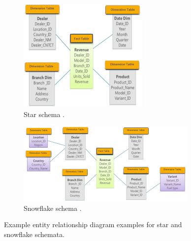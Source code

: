 \begin{figure}[H]
     \centering
     \begin{subfigure}[b]{.6\textwidth}
          \centering
          \includegraphics[width=\textwidth]{figures/star-schema.jpeg}
          \caption{Star schema \cite{StarandS87:online}.}
          \label{fig:star-schema}
     \end{subfigure}
     
     \begin{subfigure}[b]{.9\textwidth}
          \centering
          \includegraphics[width=\textwidth]{figures/snowflake-schema.jpeg}
          \caption{Snowflake schema \cite{StarandS87:online}.}
          \label{fig:snowflake-schema}
     \end{subfigure}
     \caption{Example entity relationship diagram examples for star and snowflake schemata.}
     \label{fig:star-snowflake-schemata}
\end{figure}


